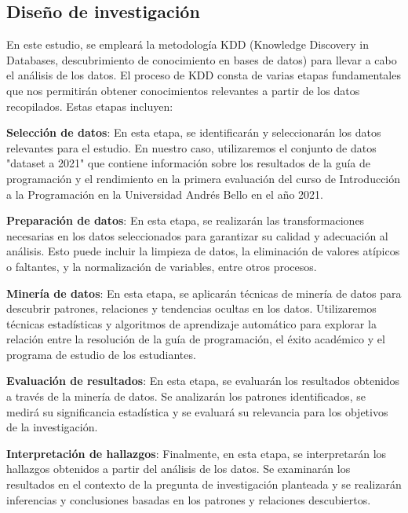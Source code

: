 \subsection{Diseño de investigación}

En este estudio, se empleará la metodología KDD (Knowledge Discovery in Databases, descubrimiento de conocimiento en bases de datos) para llevar a cabo el análisis de los datos. El proceso de KDD consta de varias etapas fundamentales que nos permitirán obtener conocimientos relevantes a partir de los datos recopilados. Estas etapas incluyen:

\textbf{Selección de datos}: En esta etapa, se identificarán y seleccionarán los datos relevantes para el estudio. En nuestro caso, utilizaremos el conjunto de datos "dataset a 2021" que contiene información sobre los resultados de la guía de programación y el rendimiento en la primera evaluación del curso de Introducción a la Programación en la Universidad Andrés Bello en el año 2021.

\textbf{Preparación de datos}: En esta etapa, se realizarán las transformaciones necesarias en los datos seleccionados para garantizar su calidad y adecuación al análisis. Esto puede incluir la limpieza de datos, la eliminación de valores atípicos o faltantes, y la normalización de variables, entre otros procesos.

\textbf{Minería de datos}: En esta etapa, se aplicarán técnicas de minería de datos para descubrir patrones, relaciones y tendencias ocultas en los datos. Utilizaremos técnicas estadísticas y algoritmos de aprendizaje automático para explorar la relación entre la resolución de la guía de programación, el éxito académico y el programa de estudio de los estudiantes.

\textbf{Evaluación de resultados}: En esta etapa, se evaluarán los resultados obtenidos a través de la minería de datos. Se analizarán los patrones identificados, se medirá su significancia estadística y se evaluará su relevancia para los objetivos de la investigación.

\textbf{Interpretación de hallazgos}: Finalmente, en esta etapa, se interpretarán los hallazgos obtenidos a partir del análisis de los datos. Se examinarán los resultados en el contexto de la pregunta de investigación planteada y se realizarán inferencias y conclusiones basadas en los patrones y relaciones descubiertos.


